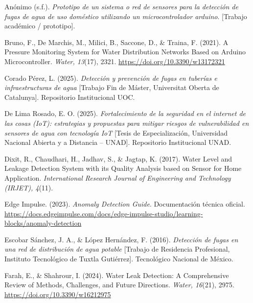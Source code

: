 \documentclass[12pt,a4paper]{article}
\begin{document}
\begin{enumerate}[label={[\arabic*]}, leftmargin=*, nosep, itemsep=0.4em]

\item Anónimo (s.f.). \textit{Prototipo de un sistema o red de sensores para la detección
de fugas de agua de uso doméstico utilizando un microcontrolador arduino}. [Trabajo
académico / prototipo].

\item Bruno, F., De Marchis, M., Milici, B., Saccone, D., \& Traina, F. (2021).
A Pressure Monitoring System for Water Distribution Networks Based on Arduino
Microcontroller. \textit{Water, 13}(17), 2321.
\url{https://doi.org/10.3390/w13172321}

\item Corado Pérez, L. (2025). \textit{Detección y prevención de fugas en tuberías e
infraestructuras de agua} [Trabajo Fin de Máster, Universitat Oberta de Catalunya].
Repositorio Institucional UOC.

\item De Lima Rosado, E. O. (2025). \textit{Fortalecimiento de la seguridad en el
internet de las cosas (IoT): estrategias y propuestas para mitigar riesgos de
vulnerabilidad en sensores de agua con tecnología IoT} [Tesis de Especialización,
Universidad Nacional Abierta y a Distancia -- UNAD]. Repositorio Institucional UNAD.

\item Dixit, R., Chaudhari, H., Jadhav, S., \& Jagtap, K. (2017). Water Level and
Leakage Detection System with its Quality Analysis based on Sensor for Home Application.
\textit{International Research Journal of Engineering and Technology (IRJET), 4}(11).

\item Edge Impulse. (2023). \textit{Anomaly Detection Guide}. Documentación técnica
oficial. \url{https://docs.edgeimpulse.com/docs/edge-impulse-studio/learning-blocks/anomaly-detection}

\item Escobar Sánchez, J. A., \& López Hernández, F. (2016). \textit{Detección de fugas
en una red de distribución de agua potable} [Trabajo de Residencia Profesional,
Instituto Tecnológico de Tuxtla Gutiérrez]. Tecnológico Nacional de México.

\item Farah, E., \& Shahrour, I. (2024). Water Leak Detection: A Comprehensive Review of
Methods, Challenges, and Future Directions. \textit{Water, 16}(21), 2975.
\url{https://doi.org/10.3390/w16212975}


\end{enumerate}
\end{document}
